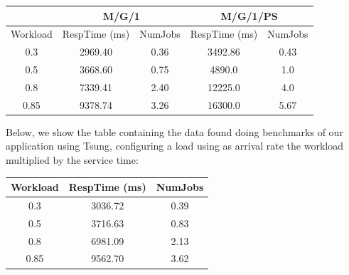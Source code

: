 \documentclass[11pt]{scrartcl} %
\begin{document}
\begin{table}[H]
\centering
\begin{tabular}{c|c|c|cc}
\multicolumn{1}{l|}{}         & \multicolumn{2}{c|}{M/G/1}                                                        & \multicolumn{2}{c}{M/G/1/PS}                                                     \\ \hline
\multicolumn{1}{l|}{Workload} & \multicolumn{1}{l|}{RespTime (ms)} & \multicolumn{1}{l|}{NumJobs} & \multicolumn{1}{l|}{RespTime (ms)} & \multicolumn{1}{l}{NumJobs} \\ \hline
0.3                           & 2969.40                           & 0.36                                         & \multicolumn{1}{c|}{3492.86}       & 0.43                                        \\
0.5                           & 3668.60                        & 0.75                                         & \multicolumn{1}{c|}{4890.0}        & 1.0                                         \\
0.8                           & 7339.41                         & 2.40                                         & \multicolumn{1}{c|}{12225.0}       & 4.0                                         \\
0.85                          & 9378.74                           & 3.26                                         & \multicolumn{1}{c|}{16300.0}      & 5.67                                       
\end{tabular}
\end{table}

Below, we show the table containing the data found doing benchmarks of our application using Tsung, configuring a load using as arrival rate the workload multiplied by the service time:

\begin{table}[H]
\centering
\begin{tabular}{c|c|c}
\multicolumn{1}{l|}{Workload} & \multicolumn{1}{l|}{RespTime (ms)} & \multicolumn{1}{l}{NumJobs} \\ \hline
0.3                           & 3036.72                            & 0.39                         \\
0.5                           & 3716.63                            & 0.83                         \\
0.8                           & 6981.09                            & 2.13                         \\
0.85                          & 9562.70                            & 3.62                        
\end{tabular}
\end{table}
\end{document}
